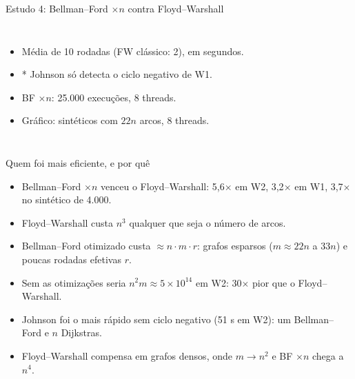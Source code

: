 \documentclass[10pt,aspectratio=169]{beamer}
\begin{document}
\begin{frame}{Estudo 4: Bellman--Ford \(\times n\) contra Floyd--Warshall}
\centering\small\TabelaTodosPares
\par\smallskip
\begin{columns}[T,onlytextwidth]
\small
\begin{itemize}
\item Média de 10 rodadas (FW clássico: 2), em segundos.
\item * Johnson só detecta o ciclo negativo de W1.
\item BF \(\times n\): 25.000 execuções, 8 threads.
\item Gráfico: sintéticos com \(22n\) arcos, 8 threads.
\end{itemize}
\centering
{}
\end{columns}
\end{frame}

\begin{frame}{Quem foi mais eficiente, e por quê}
\begin{itemize}
\item \alert{Bellman--Ford \(\times n\) venceu o Floyd--Warshall}: 5,6\(\times\) em W2, 3,2\(\times\) em W1, 3,7\(\times\) no sintético de 4.000.
\item Floyd--Warshall custa \(n^3\) \alert{qualquer que seja} o número de arcos.
\item Bellman--Ford otimizado custa \(\approx n\cdot m\cdot r\): grafos esparsos (\(m\approx22n\) a \(33n\)) e poucas rodadas efetivas \(r\).
\item Sem as otimizações seria \(n^2 m\approx5\times10^{14}\) em W2: 30\(\times\) pior que o Floyd--Warshall.
\item Johnson foi o mais rápido sem ciclo negativo (51 s em W2): um Bellman--Ford e \(n\) Dijkstras.
\item Floyd--Warshall compensa em grafos \alert{densos}, onde \(m\to n^2\) e BF \(\times n\) chega a \(n^4\).
\end{itemize}
\end{frame}
\end{document}
